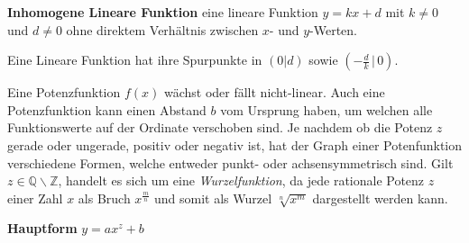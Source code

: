 \textbf{Inhomogene Lineare Funktion}  eine lineare Funktion $y = kx + d$ mit $k \neq 0$ und $d \neq 0$ ohne direktem Verh\"{a}ltnis zwischen $x$- und $y$-Werten.

Eine Lineare Funktion hat ihre Spurpunkte in $(0|d)$ sowie $\left(-\frac{d}{k} \, | \, 0\right)$.

\begin{figure}[h!]
\centering
\end{figure}


\pagebreak


Eine Potenzfunktion $f(x)$ w\"{a}chst oder f\"{a}llt nicht-linear. Auch eine Potenzfunktion kann einen Abstand $b$ vom Ursprung haben, um welchen alle Funktionswerte auf der Ordinate verschoben sind. Je nachdem ob die Potenz $z$ gerade oder ungerade, positiv oder negativ ist, hat der Graph einer Potenfunktion verschiedene Formen, welche entweder punkt- oder achsensymmetrisch sind. Gilt $z \in \mathbb{Q} \backslash \mathbb{Z}$, handelt es sich um eine \emph{Wurzelfunktion}, da jede rationale Potenz $z$ einer Zahl $x$ als Bruch $x^{\frac{m}{n}}$ und somit als Wurzel $\sqrt[n]{x^m}$ dargestellt werden kann.

\textbf{Hauptform}  $y = ax^z + b$

\extrapar


